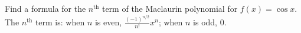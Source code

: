 {Find a formula for the $n^\text{th}$ term of the Maclaurin polynomial for $f(x)=\cos x$.
}
{The $n^\text{th}$ term is: when $n$ is even,  $\frac{(-1)^{n/2}}{n!}x^n$; when $n$ is odd, $0$.
}